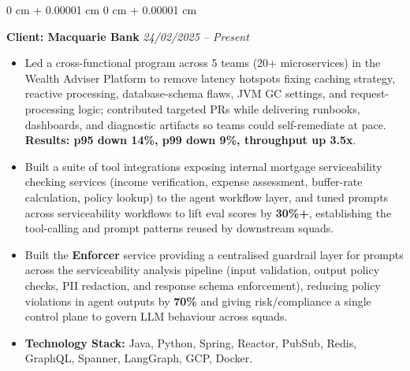 \documentclass[10pt, letterpaper]{article}
\newenvironment{onecolentry}{
    \begin{adjustwidth}{
        0 cm + 0.00001 cm
    }{
        0 cm + 0.00001 cm
    }
}{
    \end{adjustwidth}
} %
\begin{document}
\begin{onecolentry}
            \vspace{0.10 cm}
            \hspace{0.5cm}\textbf{Client: Macquarie Bank} \hfill \textit{24/02/2025 -- Present}
            \begin{itemize}[
                topsep=0.10 cm,
                parsep=0.10 cm,
                partopsep=0pt,
                itemsep=0pt,
                leftmargin=0 cm + 10pt + 0.5cm
            ]
                \item Led a cross-functional program across 5 teams (20+ microservices) in the Wealth Adviser Platform to remove latency hotspots fixing caching strategy, reactive processing, database-schema flaws, JVM GC settings, and request-processing logic; contributed targeted PRs while delivering runbooks, dashboards, and diagnostic artifacts so teams could self-remediate at pace. \textbf{Results: p95 down 14\%, p99 down 9\%, throughput up 3.5x}.
                \item Built a suite of tool integrations exposing internal mortgage serviceability checking services (income verification, expense assessment, buffer-rate calculation, policy lookup) to the agent workflow layer, and tuned prompts across serviceability workflows to lift eval scores by \textbf{30\%+}, establishing the tool-calling and prompt patterns reused by downstream squads.
                \item Built the \textbf{Enforcer} service providing a centralised guardrail layer for prompts across the serviceability analysis pipeline (input validation, output policy checks, PII redaction, and response schema enforcement), reducing policy violations in agent outputs by \textbf{70\%} and giving risk/compliance a single control plane to govern LLM behaviour across squads.
                \item \textbf{Technology Stack:} Java, Python, Spring, Reactor, PubSub, Redis, GraphQL, Spanner, LangGraph, GCP, Docker.
            \end{itemize}


\end{onecolentry}
\end{document}
